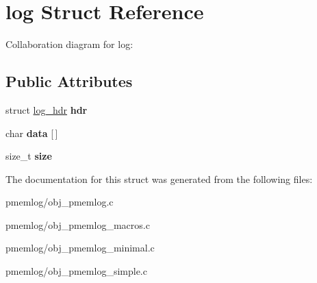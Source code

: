 \hypertarget{structlog}{}\section{log Struct Reference}
\label{structlog}


Collaboration diagram for log\+:
\subsection*{Public Attributes}
\begin{DoxyCompactItemize}
\item 
\mbox{\label{structlog_a7efba80057165a0d78f8b213d615d8e5}} 
struct \hyperlink{structlog__hdr}{log\+\_\+hdr} {\bfseries hdr}
\item 
\mbox{\label{structlog_aef1f6dafce487d753bd62f7090d6f338}} 
char {\bfseries data} \mbox{[}$\,$\mbox{]}
\item 
\mbox{\label{structlog_a083e922858e02fafcbc09e5693f6d859}} 
size\+\_\+t {\bfseries size}
\end{DoxyCompactItemize}


The documentation for this struct was generated from the following files\+:\begin{DoxyCompactItemize}
\item 
pmemlog/obj\+\_\+pmemlog.\+c\item 
pmemlog/obj\+\_\+pmemlog\+\_\+macros.\+c\item 
pmemlog/obj\+\_\+pmemlog\+\_\+minimal.\+c\item 
pmemlog/obj\+\_\+pmemlog\+\_\+simple.\+c\end{DoxyCompactItemize}
